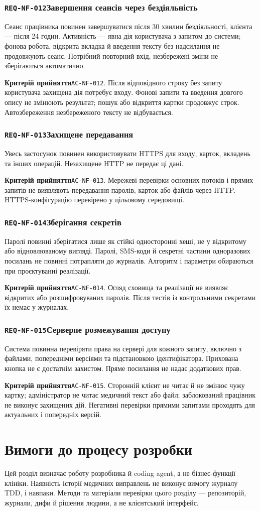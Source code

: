 \documentclass[11pt,a4paper]{article}
\newcommand{\requirement}[4]{%
  \Needspace{7\baselineskip}%
  \subsubsection*{\hypertarget{#1}{\texttt{#1}}\quad #2}%
  #3\par
  \textbf{Критерій прийняття}\quad #4\par\medskip}
\begin{document}
\requirement{REQ-NF-012}{Завершення сеансів через бездіяльність}{Сеанс працівника повинен завершуватися після 30 хвилин бездіяльності, клієнта — після 24 годин. Активність — явна дія користувача з запитом до системи; фонова робота, відкрита вкладка й введення тексту без надсилання не продовжують сеанс. Потрібний повторний вхід, незбережені зміни не зберігаються автоматично.}{\hypertarget{AC-NF-012}{\texttt{AC-NF-012}}. Після відповідного строку без запиту користувача захищена дія потребує входу. Фонові запити та введення довгого опису не змінюють результат; пошук або відкриття картки продовжує строк. Автозбереження незбереженого тексту не відбувається.}

\requirement{REQ-NF-013}{Захищене передавання}{Увесь застосунок повинен використовувати HTTPS для входу, карток, вкладень та інших операцій. Незахищене HTTP не передає ці дані.}{\hypertarget{AC-NF-013}{\texttt{AC-NF-013}}. Мережеві перевірки основних потоків і прямих запитів не виявляють передавання паролів, карток або файлів через HTTP. HTTPS-конфігурацію перевірено у цільовому середовищі.}

\requirement{REQ-NF-014}{Зберігання секретів}{Паролі повинні зберігатися лише як стійкі односторонні хеші, не у відкритому або відновлюваному вигляді. Паролі, SMS-коди й секретні частини одноразових посилань не повинні потрапляти до журналів. Алгоритм і параметри обираються при проєктуванні реалізації.}{\hypertarget{AC-NF-014}{\texttt{AC-NF-014}}. Огляд сховища та реалізації не виявляє відкритих або розшифровуваних паролів. Після тестів із контрольними секретами їх немає у журналах.}

\requirement{REQ-NF-015}{Серверне розмежування доступу}{Система повинна перевіряти права на сервері для кожного запиту, включно з файлами, попередніми версіями та підстановкою ідентифікатора. Прихована кнопка не є достатнім захистом. Пряме посилання не надає додаткових прав.}{\hypertarget{AC-NF-015}{\texttt{AC-NF-015}}. Сторонній клієнт не читає й не змінює чужу картку; адміністратор не читає медичний текст або файл; заблокований працівник не виконує захищених дій. Негативні перевірки прямими запитами проходять для актуальних і попередніх версій.}

\section{Вимоги до процесу розробки}
Цей розділ визначає роботу розробника й coding agent, а не бізнес-функції клініки. Наявність історії медичних виправлень не виконує вимогу журналу TDD, і навпаки. Методи та матеріали перевірки цього розділу — репозиторій, журнали, дифи й рішення людини, а не клієнтський інтерфейс.
\end{document}
